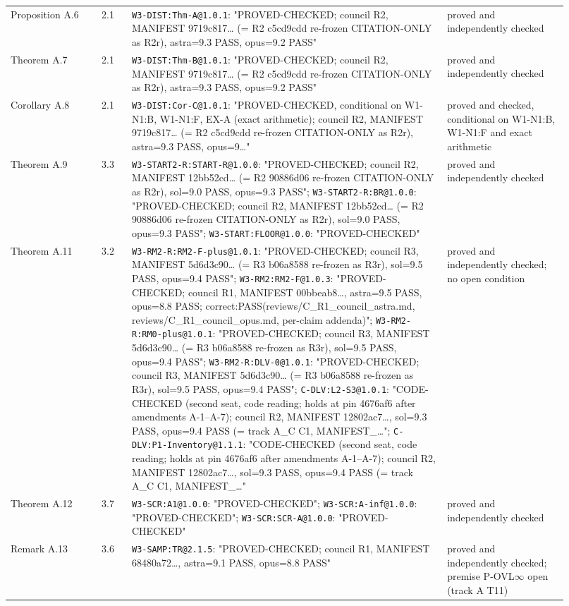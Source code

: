 \begin{longtable}{@{}p{0.15\linewidth}p{0.05\linewidth}p{0.52\linewidth}p{0.2\linewidth}@{}}
Proposition A.6 & 2.1 & \texttt{W3-DIST:Thm-A@1.0.1}: "PROVED-CHECKED; council R2, MANIFEST 9719c817\ldots{} (= R2 c5cd9cdd re-frozen CITATION-ONLY as R2r), astra=9.3 PASS, opus=9.2 PASS" & proved and independently checked \\
Theorem A.7 & 2.1 & \texttt{W3-DIST:Thm-B@1.0.1}: "PROVED-CHECKED; council R2, MANIFEST 9719c817\ldots{} (= R2 c5cd9cdd re-frozen CITATION-ONLY as R2r), astra=9.3 PASS, opus=9.2 PASS" & proved and independently checked \\
Corollary A.8 & 2.1 & \texttt{W3-DIST:Cor-C@1.0.1}: "PROVED-CHECKED, conditional on W1-N1:B, W1-N1:F, EX-A (exact arithmetic); council R2, MANIFEST 9719c817\ldots{} (= R2 c5cd9cdd re-frozen CITATION-ONLY as R2r), astra=9.3 PASS, opus=9\ldots{}" & proved and checked, conditional on W1-N1:B, W1-N1:F and exact arithmetic \\
Theorem A.9 & 3.3 & \texttt{W3-START2-R:START-R@1.0.0}: "PROVED-CHECKED; council R2, MANIFEST 12bb52cd\ldots{} (= R2 90886d06 re-frozen CITATION-ONLY as R2r), sol=9.0 PASS, opus=9.3 PASS"; \texttt{W3-START2-R:BR@1.0.0}: "PROVED-CHECKED; council R2, MANIFEST 12bb52cd\ldots{} (= R2 90886d06 re-frozen CITATION-ONLY as R2r), sol=9.0 PASS, opus=9.3 PASS"; \texttt{W3-START:FLOOR@1.0.0}: "PROVED-CHECKED" & proved and independently checked \\
Theorem A.11 & 3.2 & \texttt{W3-RM2-R:RM2-F-plus@1.0.1}: "PROVED-CHECKED; council R3, MANIFEST 5d6d3c90\ldots{} (= R3 b06a8588 re-frozen as R3r), sol=9.5 PASS, opus=9.4 PASS"; \texttt{W3-RM2:RM2-F@1.0.3}: "PROVED-CHECKED; council R1, MANIFEST 00bbeab8\ldots{}, astra=9.5 PASS, opus=8.8 PASS; correct:PASS(reviews/C\_R1\_council\_astra.md, reviews/C\_R1\_council\_opus.md, per-claim addenda)"; \texttt{W3-RM2-R:RM0-plus@1.0.1}: "PROVED-CHECKED; council R3, MANIFEST 5d6d3c90\ldots{} (= R3 b06a8588 re-frozen as R3r), sol=9.5 PASS, opus=9.4 PASS"; \texttt{W3-RM2-R:DLV-0@1.0.1}: "PROVED-CHECKED; council R3, MANIFEST 5d6d3c90\ldots{} (= R3 b06a8588 re-frozen as R3r), sol=9.5 PASS, opus=9.4 PASS"; \texttt{C-DLV:L2-S3@1.0.1}: "CODE-CHECKED (second seat, code reading; holds at pin 4676af6 after amendments A-1--A-7); council R2, MANIFEST 12802ac7\ldots{}, sol=9.3 PASS, opus=9.4 PASS (= track A\_C C1, MANIFEST\_\ldots{}"; \texttt{C-DLV:P1-Inventory@1.1.1}: "CODE-CHECKED (second seat, code reading; holds at pin 4676af6 after amendments A-1--A-7); council R2, MANIFEST 12802ac7\ldots{}, sol=9.3 PASS, opus=9.4 PASS (= track A\_C C1, MANIFEST\_\ldots{}" & proved and independently checked; no open condition \\
Theorem A.12 & 3.7 & \texttt{W3-SCR:A1@1.0.0}: "PROVED-CHECKED"; \texttt{W3-SCR:A-inf@1.0.0}: "PROVED-CHECKED"; \texttt{W3-SCR:SCR-A@1.0.0}: "PROVED-CHECKED" & proved and independently checked \\
Remark A.13 & 3.6 & \texttt{W3-SAMP:TR@2.1.5}: "PROVED-CHECKED; council R1, MANIFEST 68480a72\ldots{}, astra=9.1 PASS, opus=8.8 PASS" & proved and independently checked; premise P-OVL$\infty$ open (track A T11) \\
\bottomrule
\end{longtable}
\endgroup
